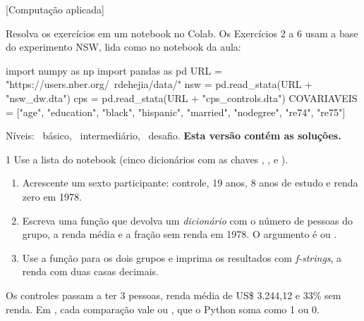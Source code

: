 \documentclass[lista]{tmlnotas}
\begin{document}
[Computação aplicada]

\noindent Resolva os exercícios em um notebook no Colab. Os Exercícios 2 a 6
usam a base do experimento NSW, lida como no notebook da aula:
\begin{codigo}
import numpy as np
import pandas as pd
URL = "https://users.nber.org/~rdehejia/data/"
nsw = pd.read_stata(URL + "nsw_dw.dta")
cps = pd.read_stata(URL + "cps_controls.dta")
COVARIAVEIS = ["age", "education", "black", "hispanic", "married",
               "nodegree", "re74", "re75"]
\end{codigo}
Níveis: ~básico, ~intermediário, ~desafio.
\ifsolucao\textbf{Esta versão contém as soluções.}\fi

\begin{exercicio}{1}
Use a lista  do notebook (cinco dicionários com as chaves
, ,  e ).
\begin{enumerate}[label=(\alph*)]
  \item Acrescente um sexto participante: controle, 19 anos, 8 anos de estudo e
        renda zero em 1978.
  \item Escreva uma função  que devolva um
        \emph{dicionário} com o número de pessoas do grupo, a renda média e a
        fração sem renda em 1978. O argumento  é  ou
        .
  \item Use a função para os dois grupos e imprima os resultados com
        \emph{f-strings}, a renda com duas casas decimais.
\end{enumerate}
\end{exercicio}
\begin{solucao}
Os controles passam a ter 3 pessoas, renda média de US\$ 3.244,12 e 33\% sem
renda. Em , cada comparação vale  ou
, que o Python soma como 1 ou 0.
\end{solucao}
\end{document}
